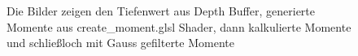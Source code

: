 \documentclass[runningheaders,a4paper]{llncs}
\begin{document}
\begin{figure}[H]
	\caption{Die Bilder zeigen den Tiefenwert aus Depth Buffer, generierte Momente aus create\_moment.glsl Shader, dann kalkulierte Momente und schließloch mit Gauss gefilterte Momente}
\end{figure}
\end{document}
